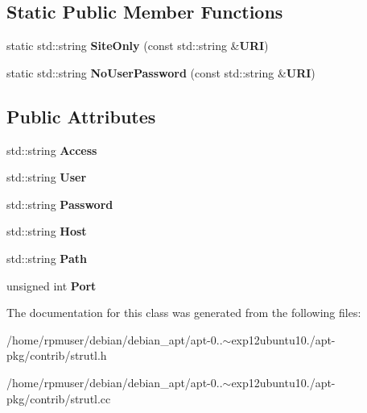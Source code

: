 \subsection*{\-Static \-Public \-Member \-Functions}
\begin{DoxyCompactItemize}
\item 
static std\-::string {\bfseries \-Site\-Only} (const std\-::string \&{\bf \-U\-R\-I})\label{classURI_aac008edf927c8dcfd400259a89de527a}

\item 
static std\-::string {\bfseries \-No\-User\-Password} (const std\-::string \&{\bf \-U\-R\-I})\label{classURI_aca22b97e23aa6456244bf8381d1fbe09}

\end{DoxyCompactItemize}
\subsection*{\-Public \-Attributes}
\begin{DoxyCompactItemize}
\item 
std\-::string {\bfseries \-Access}\label{classURI_a006a979c4801f6b6ceb33cb3acd6dc89}

\item 
std\-::string {\bfseries \-User}\label{classURI_a942d24133f1862366615a0e2acc3df39}

\item 
std\-::string {\bfseries \-Password}\label{classURI_aa73588b6ca334ed3b3809b0e36169295}

\item 
std\-::string {\bfseries \-Host}\label{classURI_a9c4801d09d1e1b363caa3f06c56a3c9c}

\item 
std\-::string {\bfseries \-Path}\label{classURI_a351e85bde61ab21378ab709e884be9ca}

\item 
unsigned int {\bfseries \-Port}\label{classURI_a6043f0f3318721543d90305cd4d1e438}

\end{DoxyCompactItemize}


\-The documentation for this class was generated from the following files\-:\begin{DoxyCompactItemize}
\item 
/home/rpmuser/debian/debian\-\_\-apt/apt-\/0..$\sim$exp12ubuntu10./apt-\/pkg/contrib/strutl.\-h\item 
/home/rpmuser/debian/debian\-\_\-apt/apt-\/0..$\sim$exp12ubuntu10./apt-\/pkg/contrib/strutl.\-cc\end{DoxyCompactItemize}
